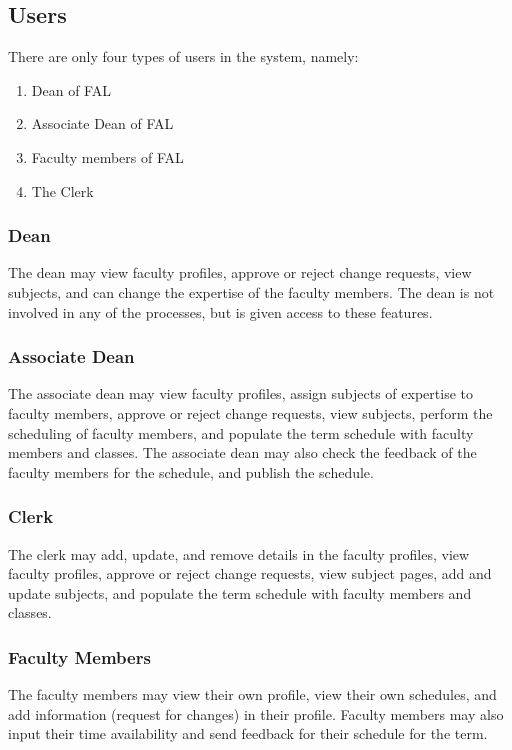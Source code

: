 \subsection{Users}
There are only four types of users in the system, namely:
\begin{enumerate}
\item Dean of FAL
\item Associate Dean of FAL
\item Faculty members of FAL
\item The Clerk
\end{enumerate}

\subsubsection{Dean}
The dean may view faculty profiles, approve or reject change requests, view subjects, and can change the expertise of the faculty members. The dean is not involved in any of the processes, but is given access to these features.

\subsubsection{Associate Dean}
The associate dean may view faculty profiles, assign subjects of expertise to faculty members, approve or reject change requests, view subjects, perform the scheduling of faculty members, and populate the term schedule with faculty members and classes. The associate dean may also check the feedback of the faculty members for the schedule, and publish the schedule.

\subsubsection{Clerk}
The clerk may add, update, and remove details in the faculty profiles, view faculty profiles, approve or reject change requests, view subject pages, add and update subjects, and populate the term schedule with faculty members and classes.

\subsubsection{Faculty Members}
The faculty members may view their own profile, view their own schedules, and add information (request for changes) in their profile. Faculty members may also input their time availability and send feedback for their schedule for the term.


